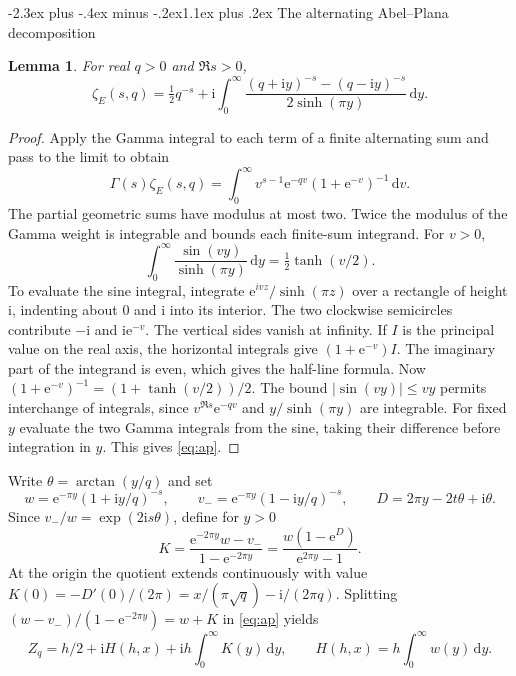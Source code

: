 \documentclass[11pt,a4paper]{article}
\makeatletter
\newtheorem{lemma}[theorem]{Lemma}
\newcommand{\dd}{\,\mathrm d}
\newcommand{\ii}{\mathrm i}
\newcommand{\e}{\mathrm e}
\renewcommand\section{\@startsection{section}{1}{\z@}
  {-2.3ex plus -.4ex minus -.2ex}{1.1ex plus .2ex}
  {\normalfont\large\bfseries\centering}}
\makeatother
\begin{document}
\section{The alternating Abel--Plana decomposition}
\begin{lemma}\label{lem:ap}
For real $q>0$ and $\Re s>0$,
\begin{equation}\label{eq:ap}
\zeta_E(s,q)=\tfrac12q^{-s}
+\ii\int_0^\infty\frac{(q+\ii y)^{-s}-(q-\ii y)^{-s}}
 {2\sinh(\pi y)}\dd y .
\end{equation}
\end{lemma}
\begin{proof}
Apply the Gamma integral to each term of a finite alternating sum
and pass to the limit to obtain
\[
 \Gamma(s)\zeta_E(s,q)=
 \int_0^\infty v^{s-1}\e^{-qv}(1+\e^{-v})^{-1}\dd v.
\]
The partial geometric sums have modulus at most two. Twice the modulus of the Gamma weight is integrable and bounds each finite-sum integrand. For $v>0$,
\[
 \int_0^\infty\frac{\sin(vy)}{\sinh(\pi y)}\dd y
 =\tfrac12\tanh(v/2).
\]
To evaluate the sine integral, integrate $\e^{ivz}/\sinh(\pi z)$ over a rectangle of height
$\ii$, indenting about $0$ and $\ii$ into its interior. The two
clockwise semicircles contribute $-\ii$ and $\ii\e^{-v}$.
The vertical sides vanish at infinity. If $I$ is the principal value
on the real axis, the horizontal integrals give $(1+\e^{-v})I$.
The imaginary part of the integrand is even, which gives the half-line formula. Now $(1+\e^{-v})^{-1}=(1+\tanh(v/2))/2$.
The bound $|\sin(vy)|\le vy$ permits interchange of integrals,
since $v^{\Re s}\e^{-qv}$ and $y/\sinh(\pi y)$ are integrable.
For fixed $y$ evaluate the two Gamma integrals from the sine, taking
their difference before integration in $y$. This gives \eqref{eq:ap}.
\end{proof}

Write $\theta=\arctan(y/q)$ and set
\[
 w=\e^{-\pi y}(1+\ii y/q)^{-s},\qquad
 v_-=\e^{-\pi y}(1-\ii y/q)^{-s},\qquad
 D=2\pi y-2t\theta+\ii\theta .
\]
Since $v_-/w=\exp(2\ii s\theta)$, define for $y>0$
\begin{equation}\label{eq:K}
 K=\frac{\e^{-2\pi y}w-v_-}{1-\e^{-2\pi y}}
   =\frac{w(1-\e^D)}{\e^{2\pi y}-1}.
\end{equation}
At the origin the quotient extends continuously with value $K(0)=-D'(0)/(2\pi)=x/(\pi\sqrt q)-\ii/(2\pi q)$.
Splitting $(w-v_-)/(1-\e^{-2\pi y})=w+K$ in \eqref{eq:ap} yields
\begin{equation}\label{eq:split}
 Z_q=h/2+\ii H(h,x)+\ii h\int_0^\infty K(y)\dd y,\qquad
 H(h,x)=h\int_0^\infty w(y)\dd y .
\end{equation}
\end{document}
